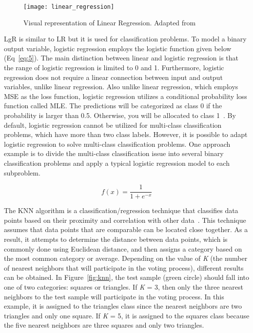 \begin{figure}[htbp]
    \centering
    \texttt{[image: linear\_regression]}
    \caption{Visual representation of Linear Regression. Adapted from~\cite{Nasteski2017AnMethods}}
    \label{fig:linear_regression}
\end{figure}

\gls{LgR} is similar to \gls{LR} but it is used for classification problems. To model a binary output variable, logistic regression employs the logistic function given below (Eq~\ref{eq:5}). The main distinction between linear and logistic regression is that the range of logistic regression is limited to 0 and 1. Furthermore, logistic regression does not require a linear connection between input and output variables, unlike linear regression. Also unlike linear regression, which employs \gls{MSE} as the loss function, logistic regression utilizes a conditional probability loss function called \gls{MLE}. The predictions will be categorized as class 0 if the probability is larger than 0.5. Otherwise, you will be allocated to class 1~\cite{Belyadi2021SupervisedLearning}. By default, logistic regression cannot be utilized for multi-class classification problems, which have more than two class labels. However, it is possible to adapt logistic regression to solve  multi-class classification problems. One approach example is to divide the multi-class classification issue into several binary classification problems and apply a typical logistic regression model to each subproblem. 

\begin{equation}\label{eq:5}
    f(x) = \frac{1}{1+e^{-x}}
\end{equation}


The \gls{KNN} algorithm is a classification/regression technique that classifies data points based on their proximity and correlation with other data~\cite{2020WhatIBM}. This technique assumes that data points that are comparable can be located close together. As a result, it attempts to determine the distance between data points, which is commonly done using Euclidean distance, and then assigns a category based on the most common category or average. Depending on the value of \textit{K} (the number of nearest neighbors that will participate in the voting process), different results can be obtained. In Figure~\ref{fig:knn}, the test sample (green circle) should fall into one of two categories: squares or triangles. If \textit{K} = 3, then only the three nearest neighbors to the test sample will participate in the voting process. In this example, it is assigned to the triangles class since the nearest neighbors are two triangles and only one square. If \textit{K} = 5, it is assigned to the squares class because the five nearest neighbors are three squares and only two triangles.

